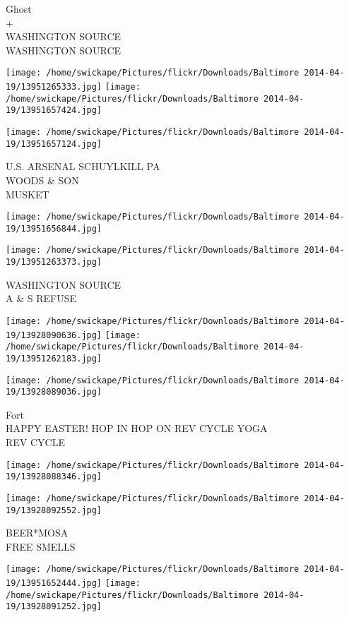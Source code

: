\documentclass[10pt,letterpaper]{article}
\begin{document}
Ghost\\
+\\
WASHINGTON SOURCE\\
WASHINGTON SOURCE
\pagebreak

\texttt{[image: /home/swickape/Pictures/flickr/Downloads/Baltimore 2014-04-19/13951265333.jpg]}
\texttt{[image: /home/swickape/Pictures/flickr/Downloads/Baltimore 2014-04-19/13951657424.jpg]}

\vspace{0.25in}
\texttt{[image: /home/swickape/Pictures/flickr/Downloads/Baltimore 2014-04-19/13951657124.jpg]}

U.S. ARSENAL SCHUYLKILL PA\\
WOODS \& SON\\
MUSKET
\pagebreak

\texttt{[image: /home/swickape/Pictures/flickr/Downloads/Baltimore 2014-04-19/13951656844.jpg]}

\vspace{0.25in}
\texttt{[image: /home/swickape/Pictures/flickr/Downloads/Baltimore 2014-04-19/13951263373.jpg]}

WASHINGTON SOURCE\\
A \& S REFUSE
\pagebreak

\texttt{[image: /home/swickape/Pictures/flickr/Downloads/Baltimore 2014-04-19/13928090636.jpg]}
\texttt{[image: /home/swickape/Pictures/flickr/Downloads/Baltimore 2014-04-19/13951262183.jpg]}

\vspace{0.25in}
\texttt{[image: /home/swickape/Pictures/flickr/Downloads/Baltimore 2014-04-19/13928089036.jpg]}

Fort\\
HAPPY EASTER! HOP IN HOP ON REV CYCLE YOGA\\
REV CYCLE
\pagebreak

\texttt{[image: /home/swickape/Pictures/flickr/Downloads/Baltimore 2014-04-19/13928088346.jpg]}

\vspace{0.25in}
\texttt{[image: /home/swickape/Pictures/flickr/Downloads/Baltimore 2014-04-19/13928092552.jpg]}

BEER*MOSA\\
FREE SMELLS
\pagebreak

\texttt{[image: /home/swickape/Pictures/flickr/Downloads/Baltimore 2014-04-19/13951652444.jpg]}
\texttt{[image: /home/swickape/Pictures/flickr/Downloads/Baltimore 2014-04-19/13928091252.jpg]}
\end{document}
